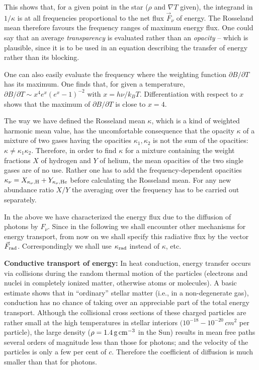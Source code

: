 \documentclass[a4paper,10pt]{article}
\begin{document}
{\noindent}This shows that, for a given point in the star ($\rho$ and $\nabla T$ given), the integrand in $1/\kappa$ is at all frequencies proportional to the net flux $\vec{F}_\nu$ of energy. The Rosseland mean therefore favours the frequency ranges of maximum energy flux. One could say that an average \textit{transparency} is evaluated rather than an \textit{opacity} -- which is plausible, since it is to be used in an equation describing the transfer of energy rather than its blocking.

{\noindent}One can also easily evaluate the frequency where the weighting function $\partial B/\partial T$ has its maximum. One finds that, for given a temperature, $\partial B/\partial T\sim x^4e^x(e^x-1)^{-2}$ with $x=h\nu/k_BT$. Differentiation with respect to $x$ shows that the maximum of $\partial B/\partial T$ is close to $x=4$.

{\noindent}The way we have defined the Rosseland mean $\kappa$, which is a kind of weighted harmonic mean value, has the uncomfortable consequence that the opacity $\kappa$ of a mixture of two gases having the opacities $\kappa_1,\kappa_2$ is not the sum of the opacities: $\kappa\neq\kappa_1\kappa_2$. Therefore, in order to find $\kappa$ for a mixture containing the weight fractions $X$ of hydrogen and $Y$ of helium, the mean opacities of the two single gases are of no use. Rather one has to add the frequency-dependent opacities $\kappa_\nu=X_{\kappa_\nu,{\rm H}}+Y_{\kappa_\nu,{\rm He}}$ before calculating the Rosseland mean. For any new abundance ratio $X/Y$ the averaging over the frequency has to be carried out separately.

{\noindent}In the above we have characterized the energy flux due to the diffusion of photons by $F_\nu$. Since in the following we shall encounter other mechanisms for energy transport, from now on we shall specify this radiative flux by the vector $\vec{F}_{\rm rad}$. Correspondingly we shall use $\kappa_{\rm rad}$ instead of  $\kappa$, etc.

{\noindent}\textbf{Conductive transport of energy:} In heat conduction, energy transfer occurs via collisions during the random thermal motion of the particles (electrons and nuclei in completely ionized matter, otherwise atoms or molecules). A basic estimate shows that in ``ordinary'' stellar matter (i.e., in a non-degenerate gas), conduction has no chance of taking over an appreciable part of the total energy transport. Although the collisional cross sections of these charged particles are rather small at the high temperatures in stellar interiors $(10^{-18}-10^{-20}\,cm^2$ per particle), the large density ($\rho=1.4\,{\rm g\,cm^{-3}}$ in the Sun) results in mean free paths several orders of magnitude less than those for photons; and the velocity of the particles is only a few per cent of $c$. Therefore the coefficient of diffusion is much smaller than that for photons.
\end{document}
